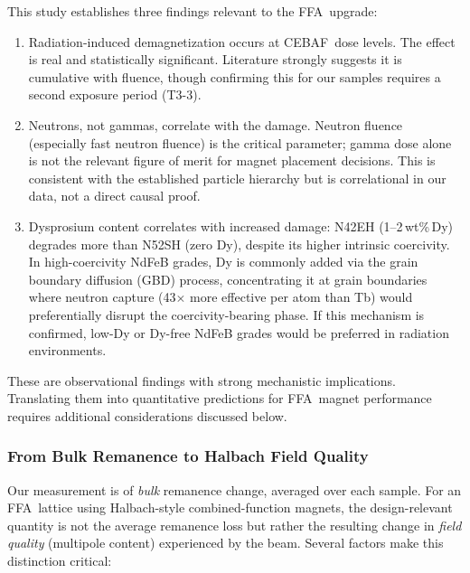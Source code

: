 \documentclass[11pt,letterpaper]{article}
\newcommand{\CEBAF}{CEBAF}
\newcommand{\FFA}{FFA}
\begin{document}
This study establishes three findings relevant to the \FFA~upgrade:
\begin{enumerate}
    \item Radiation-induced demagnetization occurs at \CEBAF~dose
    levels. The effect is real and statistically significant. Literature
    strongly suggests it is cumulative with fluence, though confirming this
    for our samples requires a second exposure period (T3-3).
    \item Neutrons, not gammas, correlate with the damage. Neutron
    fluence (especially fast neutron fluence) is the critical parameter;
    gamma dose alone is not the relevant figure of merit for magnet placement
    decisions. This is consistent with the established particle hierarchy
    but is correlational in our data, not a direct causal proof.
    \item Dysprosium content correlates with increased damage:
    N42EH (1--2\,wt\%\,Dy) degrades more than N52SH (zero Dy), despite its
    higher intrinsic coercivity. In high-coercivity NdFeB grades, Dy is
    commonly added via the grain boundary diffusion (GBD) process,
    concentrating it at grain boundaries where neutron capture
    (43$\times$ more effective per atom than Tb) would preferentially
    disrupt the coercivity-bearing phase. If this mechanism is confirmed,
    low-Dy or Dy-free NdFeB grades would be preferred in radiation
    environments.
\end{enumerate}

These are observational findings with strong mechanistic implications.
Translating them into quantitative
predictions for \FFA~magnet performance requires additional considerations
discussed below.

\subsubsection{From Bulk Remanence to Halbach Field Quality}

Our measurement is of \emph{bulk} remanence change, averaged over each
sample. For an \FFA~lattice using Halbach-style combined-function magnets,
the design-relevant quantity is not the average remanence loss but rather
the resulting change in \emph{field quality} (multipole content) experienced
by the beam. Several factors make this distinction critical:
\end{document}

